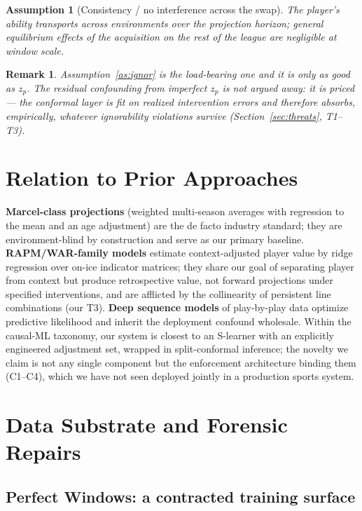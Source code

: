 \documentclass[11pt]{article}
\newtheorem{assumption}{Assumption}
\newtheorem{remark}{Remark}
\begin{document}
\begin{assumption}[Consistency / no interference across the swap]\label{as:consistency}
The player's ability transports across environments over the projection horizon; general
equilibrium effects of the acquisition on the rest of the league are negligible at
window scale.
\end{assumption}

\begin{remark}
Assumption~\ref{as:ignor} is the load-bearing one and it is only as good as $z_p$. The
residual confounding from imperfect $z_p$ is not argued away: it is \emph{priced} --- the
conformal layer is fit on realized intervention errors and therefore absorbs, empirically,
whatever ignorability violations survive (Section~\ref{sec:threats}, T1--T3).
\end{remark}

\section{Relation to Prior Approaches}

\textbf{Marcel-class projections} (weighted multi-season averages with regression to the
mean and an age adjustment) are the de facto industry standard; they are environment-blind
by construction and serve as our primary baseline. \textbf{RAPM/WAR-family models} estimate
context-adjusted player value by ridge regression over on-ice indicator matrices; they share
our goal of separating player from context but produce retrospective value, not forward
projections under specified interventions, and are afflicted by the collinearity of
persistent line combinations (our T3). \textbf{Deep sequence models} of play-by-play data
optimize predictive likelihood and inherit the deployment confound wholesale. Within the
causal-ML taxonomy, our system is closest to an S-learner with an explicitly engineered
adjustment set, wrapped in split-conformal inference; the novelty we claim is not any single
component but the enforcement architecture binding them (C1--C4), which we have not seen
deployed jointly in a production sports system.

\section{Data Substrate and Forensic Repairs}\label{sec:data}

\subsection{Perfect Windows: a contracted training surface}
\end{document}
